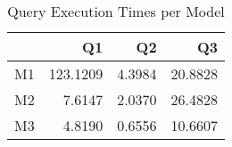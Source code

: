 \begin{table}[H]
\centering
\caption{Query Execution Times per Model}
\label{tab:model_comparison}
\begin{tabular}{lrrr}
\toprule
 & Q1 & Q2 & Q3 \\
\midrule
M1 & 123.1209 & 4.3984 & 20.8828 \\
M2 & 7.6147 & 2.0370 & 26.4828 \\
M3 & 4.8190 & 0.6556 & 10.6607 \\
\bottomrule
\end{tabular}
\end{table}
